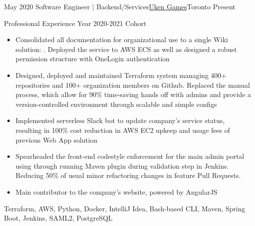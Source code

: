 %
%
%
\begin{experiences}
  \experience
    {May 2020}   {Software Engineer | Backend/Services}{\href{https://uken.com}{Uken Games}}{Toronto}
    {Present} {
                    Professional Experience Year 2020-2021 Cohort 
                    \begin{itemize}
                        \item Consolidated all documentation for organizational use to a single Wiki solution: . Deployed the service to AWS ECS as well as designed a robust permission structure with OneLogin authentication 
                        
                        \item Designed, deployed and maintained Terraform system managing 400+ repositories and 100+ organization members on Github. Replaced the manual process, which allow for 90\% time-saving hands off with admins and provide a version-controlled environment through scalable and simple configs
                        
                        \item Implemented serverless Slack bot to update company's service status, resulting in 100\% cost reduction in AWS EC2 upkeep and usage fees of previous Web App solution
                        
                        \item Spearheaded the front-end codestyle enforcement for the main admin portal using   through running Maven plugin during validation step in Jenkins.  Reducing 50\% of usual minor refactoring changes in feature Pull Requests.
                        
                        \item Main contributor to the company's website, powered by AngularJS
                    \end{itemize}
                    }
                    {Terraform, AWS, Python, Docker, IntelliJ Idea, Bash-based CLI, Maven, Spring Boot, Jenkins, SAML2, PostgreSQL}
\end{experiences}
